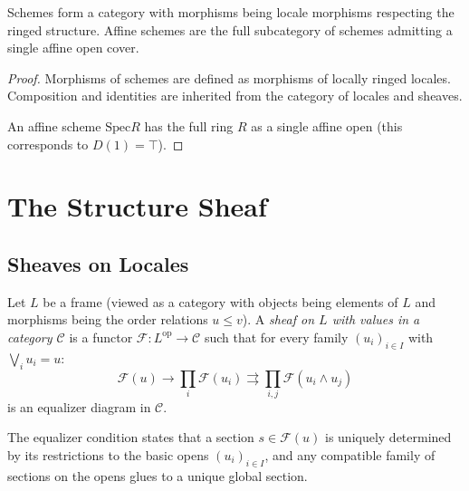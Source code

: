 \begin{theorem}
  \label{thm:universal-property-schemes}
  Schemes form a category with morphisms being locale morphisms respecting the ringed structure.
  Affine schemes are the full subcategory of schemes admitting a single affine open cover.
\end{theorem}

\begin{proof}
  Morphisms of schemes are defined as morphisms of locally ringed locales. Composition and identities 
  are inherited from the category of locales and sheaves.
  
  An affine scheme $\mathrm{Spec} R$ has the full ring $R$ as a single affine open (this corresponds to $D(1) = \top$).
\end{proof}

\chapter{The Structure Sheaf}

\section{Sheaves on Locales}

\begin{definition}
  \label{def:sheaf-locale}
  \leanok
  Let $L$ be a frame (viewed as a category with objects being elements of $L$ and morphisms being
  the order relations $u \leq v$). A \emph{sheaf on $L$ with values in a category $\mathcal{C}$} is a 
  functor $\mathcal{F}: L^{\mathrm{op}} \to \mathcal{C}$ such that for every family $(u_i)_{i \in I}$ with $\bigvee_i u_i = u$:
  $$\mathcal{F}(u) \to \prod_i \mathcal{F}(u_i) \rightrightarrows \prod_{i,j} \mathcal{F}(u_i \land u_j)$$
  is an equalizer diagram in $\mathcal{C}$.
\end{definition}

\begin{remark}
  \label{remark:sheaf-exactness}
  The equalizer condition states that a section $s \in \mathcal{F}(u)$ is uniquely determined by its restrictions 
  to the basic opens $(u_i)_{i \in I}$, and any compatible family of sections on the opens glues to a unique global section.
\end{remark}

